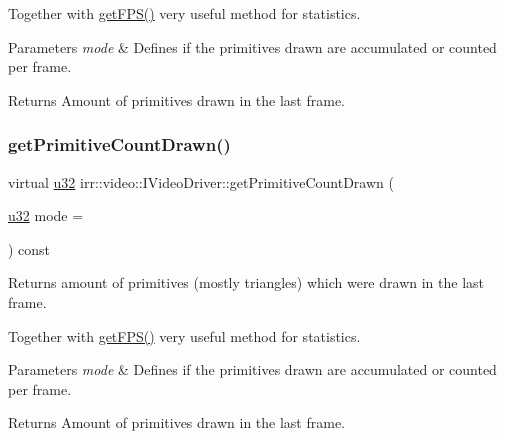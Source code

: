 Together with \hyperlink{classirr_1_1video_1_1IVideoDriver_a5b71428402c0b6a3b18b8f2fa408af13}{get\+F\+P\+S()} very useful method for statistics. 
\begin{DoxyParams}{Parameters}
{\em mode} & Defines if the primitives drawn are accumulated or counted per frame. \\
\hline
\end{DoxyParams}
\begin{DoxyReturn}{Returns}
Amount of primitives drawn in the last frame. 
\end{DoxyReturn}
\mbox{\label{classirr_1_1video_1_1IVideoDriver_a2ce9be45cacb4aa034d3afdb489a57a3}} 
\subsubsection{\texorpdfstring{get\+Primitive\+Count\+Drawn()}{getPrimitiveCountDrawn()}\hspace{0.1cm}{\footnotesize\ttfamily [2/2]}}
{\footnotesize\ttfamily virtual \hyperlink{namespaceirr_a0416a53257075833e7002efd0a18e804}{u32} irr\+::video\+::\+I\+Video\+Driver\+::get\+Primitive\+Count\+Drawn (\begin{DoxyParamCaption}\item[{\hyperlink{namespaceirr_a0416a53257075833e7002efd0a18e804}{u32}}]{mode = {} }\end{DoxyParamCaption}) const\hspace{0.3cm}{\ttfamily [pure virtual]}}



Returns amount of primitives (mostly triangles) which were drawn in the last frame. 

Together with \hyperlink{classirr_1_1video_1_1IVideoDriver_a5b71428402c0b6a3b18b8f2fa408af13}{get\+F\+P\+S()} very useful method for statistics. 
\begin{DoxyParams}{Parameters}
{\em mode} & Defines if the primitives drawn are accumulated or counted per frame. \\
\hline
\end{DoxyParams}
\begin{DoxyReturn}{Returns}
Amount of primitives drawn in the last frame. 
\end{DoxyReturn}
\mbox{\label{classirr_1_1video_1_1IVideoDriver_aa106dd9ff233497f9ea9a07dc6441c82}} 
